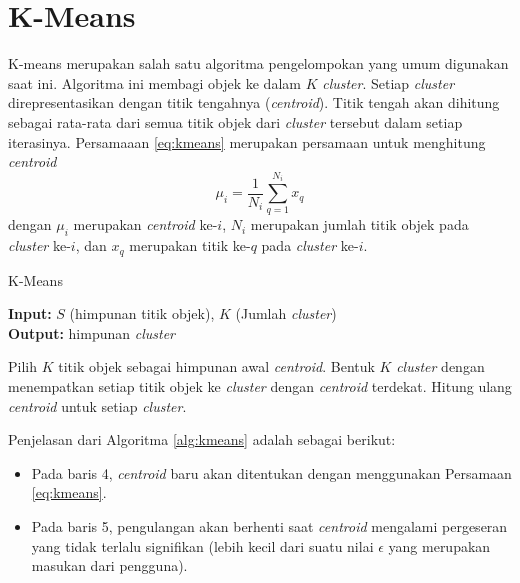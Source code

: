 \section{K-Means}
K-means merupakan salah satu algoritma pengelompokan yang umum digunakan saat ini. Algoritma ini membagi objek ke dalam $K$ \textit{cluster}. Setiap \textit{cluster} direpresentasikan dengan titik tengahnya (\textit{centroid}). Titik tengah akan dihitung sebagai rata-rata dari semua titik objek dari \textit{cluster} tersebut dalam setiap iterasinya. Persamaaan \ref{eq:kmeans} merupakan persamaan untuk menghitung \textit{centroid}
\begin{equation}
	\label{eq:kmeans}
	\mu_i=\frac{1}{N_i}\sum_{q=1}^{N_i}x_q
\end{equation}
dengan $\mu_i$ merupakan \textit{centroid} ke-$i$, $N_i$ merupakan jumlah titik objek pada \textit{cluster} ke-$i$, dan $x_q$ merupakan titik ke-$q$ pada \textit{cluster} ke-$i$.

\begin{algorithm} %
\caption{K-Means} %
\label{alg:kmeans} %
\begin{flushleft}
	\textbf{Input:} $S$ (himpunan titik objek), $K$ (Jumlah \textit{cluster})\\
	\textbf{Output:} himpunan \textit{cluster}
\end{flushleft}
\begin{algorithmic}[1] %
	\STATE Pilih $K$ titik objek sebagai himpunan awal \textit{centroid}.
	\REPEAT 
		\STATE Bentuk $K$ \textit{cluster} dengan menempatkan setiap titik objek ke \textit{cluster} dengan \textit{centroid} terdekat.
		\STATE Hitung ulang \textit{centroid} untuk setiap \textit{cluster}. 
\end{algorithmic}
\end{algorithm}

Penjelasan dari Algoritma \ref{alg:kmeans} adalah sebagai berikut:
\begin{itemize}
	\item Pada baris 4, \textit{centroid} baru akan ditentukan dengan menggunakan Persamaan \ref{eq:kmeans}.
	\item Pada baris 5, pengulangan akan berhenti saat \textit{centroid} mengalami pergeseran yang tidak terlalu signifikan (lebih kecil dari suatu nilai $\epsilon$ yang merupakan masukan dari pengguna).
\end{itemize}

